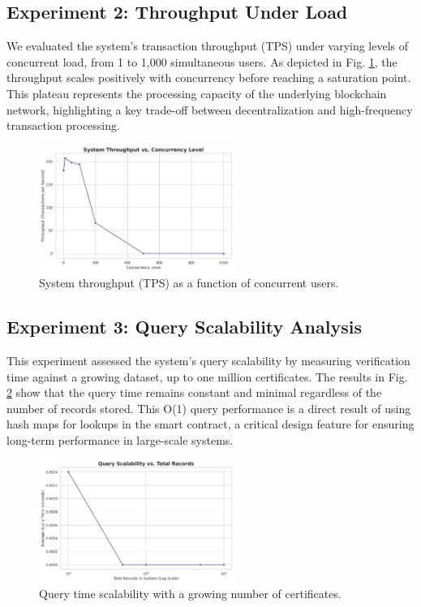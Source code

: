 \documentclass[lettersize,journal]{IEEEtran}
\begin{document}
\begin{itemize}
\subsection{Experiment 2: Throughput Under Load}
We evaluated the system's transaction throughput (TPS) under varying levels of concurrent load, from 1 to 1,000 simultaneous users. As depicted in Fig. \ref{fig:exp2}, the throughput scales positively with concurrency before reaching a saturation point. This plateau represents the processing capacity of the underlying blockchain network, highlighting a key trade-off between decentralization and high-frequency transaction processing.

\begin{figure}[!t]
\centering
\includegraphics[width=2.5in]{figures/fig2_throughput.png}
\caption{System throughput (TPS) as a function of concurrent users.}
\label{fig:exp2}
\end{figure}

\subsection{Experiment 3: Query Scalability Analysis}
This experiment assessed the system's query scalability by measuring verification time against a growing dataset, up to one million certificates. The results in Fig. \ref{fig:exp3} show that the query time remains constant and minimal regardless of the number of records stored. This O(1) query performance is a direct result of using hash maps for lookups in the smart contract, a critical design feature for ensuring long-term performance in large-scale systems.

\begin{figure}[!t]
\centering
\includegraphics[width=2.5in]{figures/fig3_scalability.png}
\caption{Query time scalability with a growing number of certificates.}
\label{fig:exp3}
\end{figure}


\end{itemize}
\end{document}
